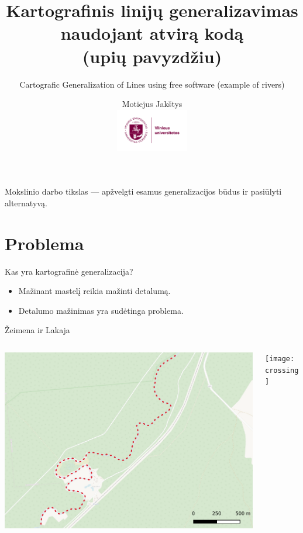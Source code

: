 \documentclass[14pt]{beamer}
\title{
    Kartografinis linijų generalizavimas naudojant atvirą kodą \\
    (upių pavyzdžiu)
}
\subtitle{
    \vspace{2em}
    Cartografic Generalization of Lines using free software (example of rivers)
}
\author{Motiejus Jakštys \\
    \includegraphics[height=5em]{../../misc/Logo_vilniaus_universitetas}
}
\newcommand{\twocols}[2]
{
    \begin{columns}[c]
        \begin{column}{0.5\textwidth}
            #1
        \end{column}
        \hspace{0pt} \vrule{}
        \begin{column}{0.5\textwidth}
            #2
        \end{column}
    \end{columns}
}
\begin{document}

\begin{frame}
\titlepage
\end{frame}

\begin{frame}
    Mokslinio darbo tikslas --- apžvelgti esamus generalizacijos būdus ir pasiūlyti
      alternatyvą.
\end{frame}

\section{Problema}

\begin{frame}{Kas yra kartografinė generalizacija?}
    \begin{itemize}[<+->]
        \item Mažinant mastelį reikia mažinti detalumą.
        \item Detalumo mažinimas yra sudėtinga problema.
    \end{itemize}
\end{frame}

\begin{frame}{Žeimena ir Lakaja}
    \twocols
    {\includegraphics[width=\textwidth]{zeimena}}
    {\texttt{[image: crossing]}}
\end{frame}
\end{document}
